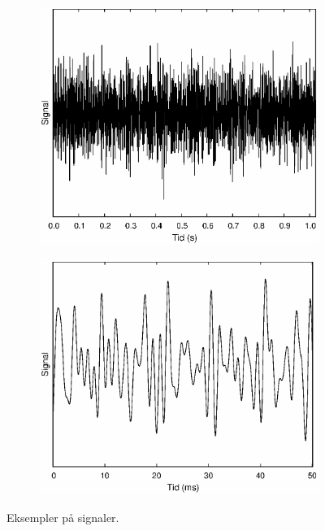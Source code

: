 \documentclass[11pt,a4paper]{article}
\begin{document}
\begin{figure}[htbp]
\begin{subfigure}{0.48\textwidth}
\end{subfigure}
\begin{subfigure}{0.48\textwidth}
\includegraphics[scale=0.5]{sigrand1}
\end{subfigure}
\begin{subfigure}{0.48\textwidth}
\includegraphics[scale=0.5]{sigrand2}
\end{subfigure}
\caption{\label{fig:sig1}Eksempler på signaler.}
\end{figure}
\end{document}
